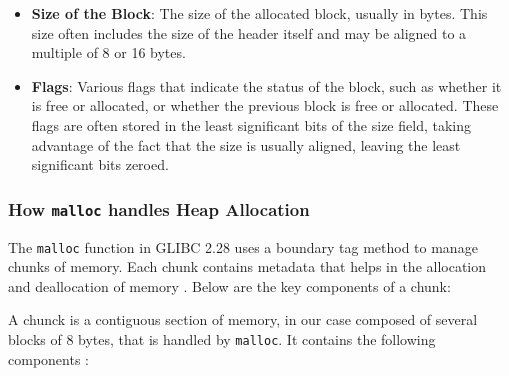     \begin{itemize}
        \item \textbf{Size of the Block}: The size of the allocated block, usually in bytes. This size often includes the size of the header itself and may be aligned to a multiple of 8 or 16 bytes.
        \item \textbf{Flags}: Various flags that indicate the status of the block, such as whether it is free or allocated, or whether the previous block is free or allocated. These flags are often stored in the least significant bits of the size field, taking advantage of the fact that the size is usually aligned, leaving the least significant bits zeroed.
    \end{itemize}

    \subsubsection{How \texttt{malloc} handles Heap Allocation}

    The \texttt{malloc} function in GLIBC 2.28 uses a boundary tag method to manage chunks of memory. Each chunk contains metadata that helps in the allocation and deallocation of memory \cite{MallocGLIBC2001} \cite{MallocInternalsWiki2023}. Below are the key components of a chunk:

    A chunck is a contiguous section of memory, in our case composed of several blocks of 8 bytes, that is handled by \texttt{malloc}. It contains the following components \cite{MallocInternalsWiki2023} \cite{StackExchangeMalloc2023}:

